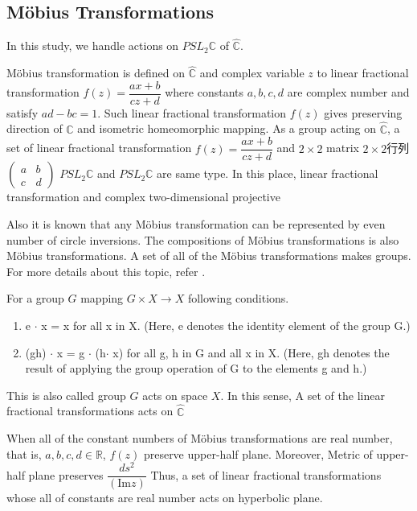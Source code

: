 \subsection{M\"obius Transformations}

In this study, we handle actions on $PSL_2\mathbb{C}$ of $\hat{\mathbb{C}}$.

M\"obius transformation is defined on $\hat{\mathbb{C}}$ and
complex variable $z$ to linear fractional transformation
$f(z)=\dfrac{ax+b}{cz+d}$ where constants $a, b, c, d$ are complex
number and satisfy $ad - bc = 1$.
Such linear fractional transformation $f(z)$ gives preserving direction of
$\hat{\mathbb{C}}$ and isometric homeomorphic mapping.
As a group acting on $\hat{\mathbb{C}}$, a set of linear fractional
transformation $f(z) = \dfrac{ax + b}{cz + d}$ and $2 \times 2$ matrix
$2\times 2$行列$\begin{pmatrix}a & b \\ c& d \end{pmatrix}$
$PSL_2\mathbb{C}$ and $PSL_2\mathbb{C}$ are same type.
In this place, linear fractional transformation and
complex two-dimensional
projective

Also it is known that any M\"obius transformation can be represented by
even number of circle inversions.
The compositions of M\"obius transformations is also M\"obius
transformations. A set of all of the M\"obius transformations makes
groups. For more details about this topic, refer \cite{marden_2016}.

For a group $G$ mapping $G \times X \to X$ following conditions.
\begin{enumerate}
 \item e $\cdot$ x = x for all x in X. (Here, e denotes the identity element of
       the group G.)
 \item (gh) $\cdot$ x = g $\cdot$ (h$\cdot$ x) for all g, h in G and all x in X.
       (Here, gh denotes the result of applying the group operation of G to the elements g and h.)
\end{enumerate}

This is also called group $G$ acts on space $X$.
In this sense, A set of the linear fractional transformations acts on
$\hat{\mathbb{C}}$

When all of the constant numbers of M\"obius transformations are real number,
that is, $a, b, c, d \in \mathbb{R}$, $f(z)$ preserve upper-half plane.
Moreover, Metric of upper-half plane preserves
$\dfrac{ds^2}{(\mathrm{Im}z)}$
Thus, a set of linear fractional transformations whose all of constants
are real number acts on hyperbolic plane.

